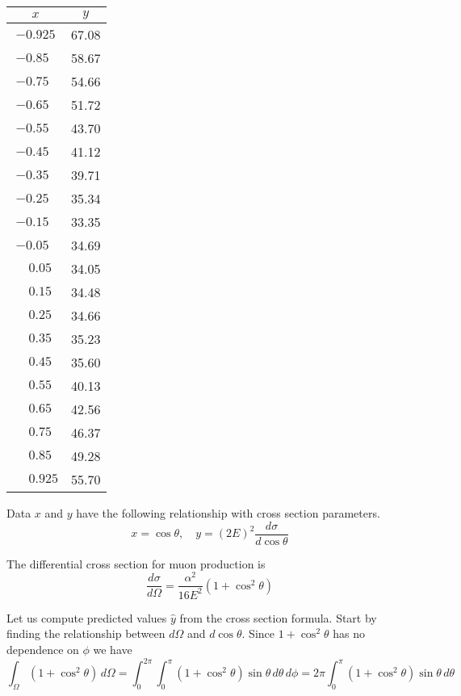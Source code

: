 \documentclass[12pt]{article}
\begin{document}
\begin{center}
\begin{tabular}{|c|c|}
\hline
$x$ & $y$\\
\hline
$-0.925$ & 67.08\\
$-0.85\phantom{0}$ & 58.67\\
$-0.75\phantom{0}$ & 54.66\\
$-0.65\phantom{0}$ & 51.72\\
$-0.55\phantom{0}$ & 43.70\\
$-0.45\phantom{0}$ & 41.12\\
$-0.35\phantom{0}$ & 39.71\\
$-0.25\phantom{0}$ & 35.34\\
$-0.15\phantom{0}$ & 33.35\\
$-0.05\phantom{0}$ & 34.69\\
$\phantom{+}0.05\phantom{0}$ & 34.05\\
$\phantom{+}0.15\phantom{0}$ & 34.48\\
$\phantom{+}0.25\phantom{0}$ & 34.66\\
$\phantom{+}0.35\phantom{0}$ & 35.23\\
$\phantom{+}0.45\phantom{0}$ & 35.60\\
$\phantom{+}0.55\phantom{0}$ & 40.13\\
$\phantom{+}0.65\phantom{0}$ & 42.56\\
$\phantom{+}0.75\phantom{0}$ & 46.37\\
$\phantom{+}0.85\phantom{0}$ & 49.28\\
$\phantom{+}0.925$ & 55.70\\
\hline
\end{tabular}
\end{center}

\noindent
Data $x$ and $y$ have the following relationship with cross section parameters.
\begin{equation*}
x=\cos\theta,
\quad
y=(2E)^2\frac{d\sigma}{d\cos\theta}
\end{equation*}

\noindent
The differential cross section for muon production is
\begin{equation*}
\frac{d\sigma}{d\Omega}=\frac{\alpha^2}{16E^2}(1+\cos^2\theta)
\end{equation*}

\noindent
Let us compute predicted values $\hat{y}$ from the cross section formula.
Start by finding the relationship between $d\Omega$ and $d\cos\theta$.
Since $1+\cos^2\theta$ has no dependence on $\phi$ we have
\begin{equation*}
\int_\Omega(1+\cos^2\theta)\,d\Omega
=\int_0^{2\pi}\int_0^{\pi}(1+\cos^2\theta)\sin\theta\,d\theta\,d\phi
=2\pi\int_0^\pi(1+\cos^2\theta)\sin\theta\,d\theta
\end{equation*}
\end{document}
